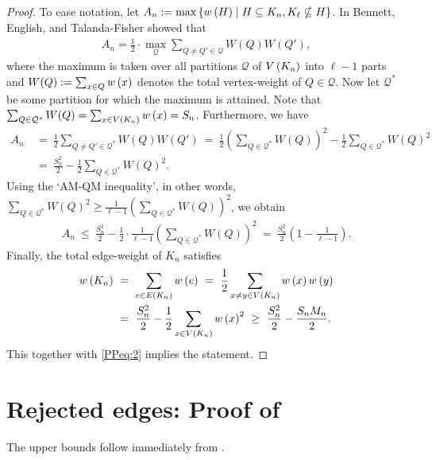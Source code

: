 \begin{proof}
To ease notation, let $A_n:=\max\left\{w\left(H\right) \mid H\subseteq K_n, K_\ell\nsubseteq H\right\}$. In \cite{BennettEnglishTalanda-Fisher2019} Bennett, English, and Talanda-Fisher showed that
\begin{align*}
A_n=\frac{1}{2} \cdot\max_{\mathcal{Q}}\sum_{Q\neq Q'\in\mathcal{Q}}W(Q)W\left(Q'\right),
\end{align*}
where the maximum is taken over all partitions $\mathcal{Q}$ of $V\left(K_n\right)$ into $\ell-1$ parts and $W(Q):=\sum_{x\in Q}w\left(x\right)$ denotes the total vertex-weight of $Q\in\mathcal{Q}$. Now let $\mathcal{Q}^\ast$ be some partition for which the maximum is attained. Note that $\sum_{Q\in\mathcal{Q}^\ast}W(Q)=\sum_{x\in V\left(K_n\right)}w\left(x\right)=S_n$. Furthermore, we have
\begin{align*}
A_n~&=~\frac{1}{2}\sum_{Q\neq Q'\in\mathcal{Q}^\ast}W(Q)W\left(Q'\right)~=~\frac{1}{2} \left(\sum_{Q\in\mathcal{Q}^\ast}W(Q)\right)^2-\frac{1}{2}\sum_{Q\in\mathcal{Q}^\ast}W(Q)^2~
\\
&=~\frac{S_n^2}{2}-\frac{1}{2}\sum_{Q\in\mathcal{Q}^\ast}W(Q)^2.
\end{align*}
Using the \lq AM-QM inequality\rq, in other words, $\sum_{Q\in\mathcal{Q}^\ast}W(Q)^2\geq \frac{1}{\ell-1}\left(\sum_{Q\in\mathcal{Q}^\ast}W(Q)\right)^2$, we obtain
\begin{align}\label{PPeq:2}
A_n~\leq~\frac{S_n^2}{2}-\frac{1}{2}\cdot \frac{1}{\ell-1}\left(\sum_{Q\in\mathcal{Q}^\ast}W(Q)\right)^2~=~ \frac{S_n^2}{2}\left(1-\frac{1}{\ell-1}\right).
\end{align}
Finally, the total edge-weight of $K_n$ satisfies
\begin{align*}
	w\left(K_n\right)~&=~\sum_{e\in E\left(K_n\right)}w\left(e\right)~=~\frac{1}{2}\sum_{x\neq y\in V\left(K_n\right)}w\left(x\right)w\left(y\right)
	\\
	&=~\frac{S_n^2}{2}-\frac{1}{2}\sum_{x\in V\left(K_n\right)}w\left(x\right)^2~\geq~ \frac{S_n^2}{2}-\frac{S_nM_n}{2}.
\end{align*}
This together with \eqref{PPeq:2} implies the statement.
\end{proof}



\section[Rejected edges]{Rejected edges: Proof of }\label{PPsec:proof_main}
The upper bounds follow immediately from .

